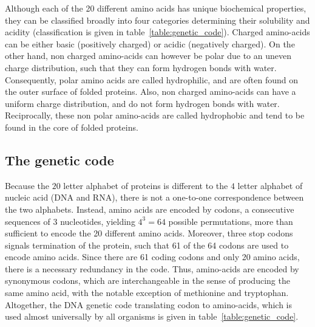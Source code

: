 Although each of the 20 different amino acids has unique biochemical properties, they can be classified broadly into four categories determining their solubility and acidity (classification is given in table~\ref{table:genetic_code}).
Charged amino-acids can be either basic (positively charged) or acidic (negatively charged).
On the other hand, non charged amino-acids can however be polar due to an uneven charge distribution, such that they can form hydrogen bonds with water.
Consequently, polar amino acids are called hydrophilic, and are often found on the outer surface of folded proteins.
Also, non charged amino-acids can have a uniform charge distribution, and do not form hydrogen bonds with water.
Reciprocally, these non polar amino-acids are called hydrophobic and tend to be found in the core of folded proteins.

\subsection{The genetic code}

Because the $20$ letter alphabet of proteins is different to the $4$ letter alphabet of nucleic acid (DNA and RNA), there is not a one-to-one correspondence between the two alphabets.
Instead, amino acids are encoded by \glspl{codon}, a consecutive sequences of 3 nucleotides, yielding $4^3=64$ possible permutations, more than sufficient to encode the 20 different amino acids.
Moreover, three stop \glspl{codon} signals termination of the protein, such that 61 of the 64 \glspl{codon} are used to encode amino acids.
Since there are 61 coding \glspl{codon} and only 20 amino acids, there is a necessary redundancy in the code.
Thus, amino-acids are encoded by synonymous \glspl{codon}, which are interchangeable in the sense of producing the same amino acid, with the notable exception of methionine and tryptophan.
Altogether, the \acrshort{DNA} genetic code translating \gls{codon} to amino-acids, which is used almost universally by all organisms is given in table~\ref{table:genetic_code}.

